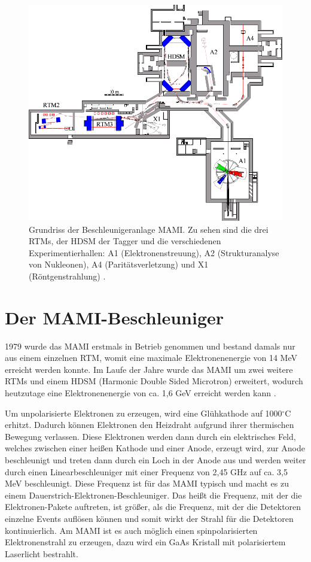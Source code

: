 \documentclass[a4paper,11pt,oneside,final,german,openbib,pdftex]{scrbook}
\begin{document}
{\begin{figure}[h!]
	\includegraphics{grundriss}
	\caption[Grundriss der MAMI-Anlage]{Grundriss der Beschleunigeranlage MAMI. Zu sehen sind die drei RTMs, der HDSM der Tagger und die verschiedenen Experimentierhallen: A1 (Elektronenstreuung), A2 (Strukturanalyse von Nukleonen), A4 (Parit\"atsverletzung) und X1 (R\"ontgenstrahlung) \cite{KPh07}.}
	\label{fig.grundriss_anlage}
\end{figure}


\section{Der MAMI-Beschleuniger}
1979 wurde das MAMI erstmals in Betrieb genommen und bestand damals nur aus einem einzelnen RTM, womit eine maximale Elektronenenergie von 14 MeV erreicht werden konnte. 
Im Laufe der Jahre wurde das MAMI um zwei weitere RTMs und einem HDSM (Harmonic Double Sided Microtron) erweitert, wodurch heutzutage eine Elektronenenergie von ca. 1,6 GeV erreicht werden kann \cite{KPh11G}. 
\newline


Um unpolarisierte Elektronen zu erzeugen, wird eine Glühkathode auf 1000$^{\circ}$C erhitzt. Dadurch können Elektronen den Heizdraht aufgrund ihrer thermischen Bewegung verlassen. Diese Elektronen werden dann durch ein elektrisches Feld, welches zwischen einer heißen Kathode und einer Anode, erzeugt wird, zur Anode beschleunigt und treten dann durch ein Loch in der Anode aus und werden weiter durch einen Linearbeschleuniger mit einer Frequenz von 2,45 GHz auf ca. 3,5 MeV beschleunigt. Diese Frequenz ist für das MAMI typisch und macht es zu einem Dauerstrich-Elektronen-Beschleuniger. Das heißt die Frequenz, mit der die Elektronen-Pakete auftreten, ist größer, als die Frequenz, mit der die Detektoren einzelne Events auflösen können und somit wirkt der Strahl für die Detektoren kontinuierlich.
Am MAMI ist es auch m\"oglich einen spinpolarisierten Elektronenstrahl zu erzeugen, dazu wird ein GaAs Kristall mit polarisiertem Laserlicht bestrahlt. 

}
\end{document}
